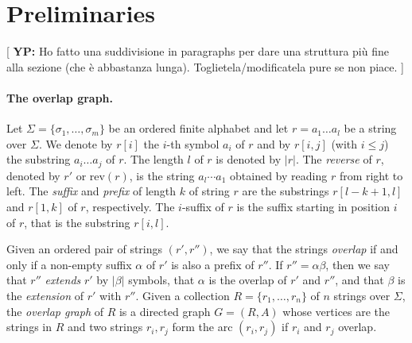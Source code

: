 \documentclass[runningheads,envcountsame,a4paper]{llncs}
\newcommand{\notaestesa}[2]{%
 \marginpar{\color{red!75!black}\textbf{\texttimes}}%
 {\color{red!75!black}%
 [\,\textbullet\,\textsf{\textbf{#1:}} %
 \textsf{\footnotesize#2}\,\textbullet\,]}%
}
\newcommand{\YP}[1]{\notaestesa{YP}{#1}}
\newcommand{\rev}{\ensuremath{\mathrm{rev}}}
\begin{document}
\section{Preliminaries}

\YP{Ho fatto una suddivisione in paragraphs per dare una struttura più
  fine alla sezione (che è abbastanza lunga). Toglietela/modificatela
  pure se non piace.}
\paragraph{The overlap graph.}
Let $\Sigma = \{\sigma_1, \dots, \sigma_m\}$ be an ordered finite
alphabet and let $r = a_1 \dots a_l$ be a string over $\Sigma$.
We denote by $r[i]$ the $i$-th symbol $a_i$ of $r$ and by $r[i,j]$ (with
$i \leq j$) the substring $a_i \dots a_j$ of $r$.
The length $l$ of $r$ is denoted by $|r|$.
The \emph{reverse} of $r$, denoted by $r'$ or $\rev(r)$, is the string
$a_l \cdots a_1$ obtained by reading $r$ from right to left.
The \emph{suffix} and \emph{prefix} of length $k$ of string $r$ are the
substrings $r[l-k +1, l]$ and $r[1, k]$ of $r$, respectively.
The $i$-suffix of $r$ is the suffix starting in position $i$ of $r$,
that is the substring $r[i, l]$.

Given an ordered pair of strings $(r', r'')$, we say that the strings
\emph{overlap} if and only if a non-empty suffix $\alpha$ of $r'$ is
also a prefix of $r''$.
If $r'' = \alpha \beta$, then we say that $r''$ \emph{extends} $r'$ by
$|\beta|$ symbols, that $\alpha$ is the overlap of $r'$ and $r''$, and
that $\beta$ is the \emph{extension} of $r'$ with $r''$.
Given a collection $R = \{r_1, \dots, r_n\}$ of $n$ strings over
$\Sigma$, the \emph{overlap graph} of $R$ is a directed graph $G=(R, A)$
whose vertices are the strings in $R$ and two strings
$r_i, r_j$ form the arc $(r_i, r_j)$ if $r_i$ and $r_j$ overlap.
\end{document}
